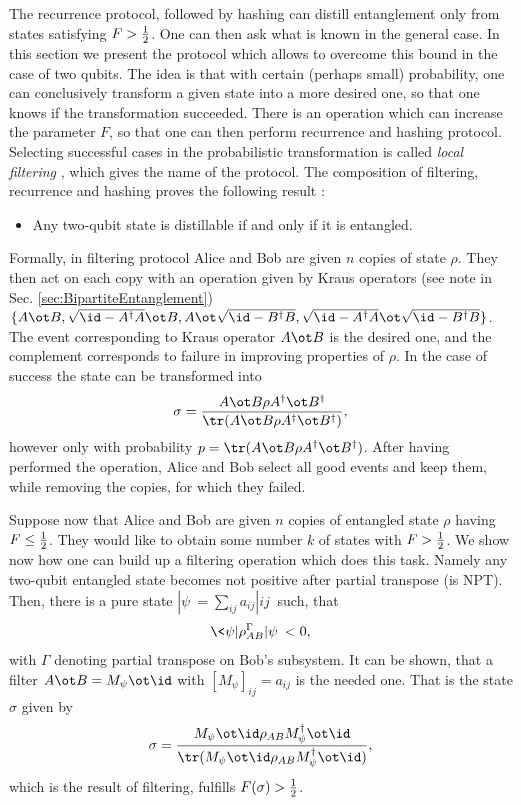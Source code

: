 \documentclass[twocolumn,aps,rmp]{revtex4}
\begin{document}
The recurrence protocol, followed by hashing can distill entanglement
only from states satisfying $F>{1\over 2}$. One can then ask what is
known in the general case.  In this section we present the protocol
which allows to overcome this bound in the case of two qubits. The
idea is that with certain (perhaps small) probability, one can
conclusively transform a given state into a more desired one, so that
one knows if the transformation succeeded. There is an operation which
can increase the parameter $F$, so that one can then perform
recurrence and hashing protocol. Selecting successful cases in the
probabilistic transformation is called {\it local filtering}
\cite{Gisin96}, which gives the name of the protocol. The composition
of filtering, recurrence and hashing proves the following result
\cite{HHH1997-distill}:

\begin{itemize}
\item Any two-qubit state is distillable if and only if it is
  entangled.
\end{itemize}

Formally, in filtering protocol Alice and Bob are given $n$ copies of
state $\rho$. They then act on each copy with an operation given by
Kraus operators (see note in Sec. \ref{sec:BipartiteEntanglement})
$\{A\ot B ,\sqrt{\id-A^{\dagger}A}\ot B, A\ot\sqrt{\id-B^{\dagger}B},
\sqrt{\id-A^{\dagger}A}\ot \sqrt{\id-B^{\dagger}B} \}$. The event
corresponding to Kraus operator $A\ot B$ is the desired one, and the
complement corresponds to failure in improving properties of $\rho$.
In the case of success the state can be transformed into
\begin{equation}
\sigma = {A\ot B\rho A^{\dagger}\ot B^{\dagger}\over {\tr}(A\ot B
\rho A^{\dagger}\ot B^{\dagger})},
\end{equation}
however only with probability $p= {\tr}(A\ot B \rho A^{\dagger}\ot
B^{\dagger})$. After having performed the operation, Alice and Bob
select all good events and keep them, while removing the copies, for
which they failed.

Suppose now that Alice and Bob are given $n$ copies of entangled
state $\rho$ having $F \leq {1\over 2}$. They would like to obtain
some number $k$ of states with $F>{1\over 2}$. We show now how one
can build up a filtering operation which does this task. Namely any
two-qubit entangled state becomes not positive after
partial transpose (is NPT). Then, there is a pure state
$|\psi\>=\sum_{ij}a_{ij}|ij\>$ such, that
\begin{equation}
\<\psi|\rho^{\Gamma}_{AB}|\psi\> <0,
\end{equation}
with $\Gamma$ denoting partial transpose on Bob's subsystem. It can be
shown, that a filter $A\ot B = M_{\psi}\ot \id$ with
$[M_{\psi}]_{ij}=a_{ij}$ is the needed one. That is the state $\sigma$
given by
\begin{equation}
  \sigma={{M_{\psi}\ot \id \rho_{AB}M_{\psi}^{\dagger}\ot
      \id}\over {\tr}(M_{\psi}\ot \id \rho_{AB}M_{\psi}^{\dagger}\ot \id)},
\end{equation}
which is the result of filtering, fulfills $F(\sigma)> {1\over 2}$.
\end{document}

